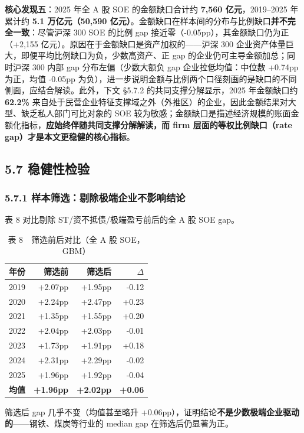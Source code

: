 \documentclass[11pt,a4paper]{ctexart}
\begin{document}
\textbf{核心发现五}：2025 年全 A 股 SOE 的金额缺口合计约 \textbf{7,560 亿元}，2019--2025 年累计约 \textbf{5.1 万亿元（50,590 亿元）}。金额缺口在样本间的分布与比例缺口\textbf{并不完全一致}：尽管沪深 300 SOE 的比例 gap 接近零（-0.05pp），其金额缺口仍为正（+2,155 亿元）。原因在于金额缺口是资产加权的------沪深 300 企业资产体量巨大，即便平均比例缺口为负，少数高资产、正 gap 的企业仍可主导金额加总；同时沪深 300 内部 gap 分布左偏（少数大额负 gap 企业拉低均值：中位数 +0.74pp 为正，均值 -0.05pp 为负），进一步说明金额与比例两个口径刻画的是缺口的不同侧面，应结合解读。此外，下文 \S5.7.2 的共同支撑分解显示，2025 年金额缺口约 \textbf{62.2\%} 来自处于民营企业特征支撑域之外（外推区）的企业，因此金额结果对大型、缺乏私人部门可比对象的 SOE 较为敏感；金额缺口是描述经济规模的账面金额化指标，\textbf{应始终伴随共同支撑分解解读，而 firm 层面的等权比例缺口（rate gap）才是本文更稳健的核心指标}。

\subsection{5.7 稳健性检验}

\subsubsection{5.7.1 样本筛选：剔除极端企业不影响结论}

表 8 对比剔除 ST/资不抵债/极端盈亏前后的全 A 股 SOE gap。

\begin{table}[H]
\centering
\small
\caption{表 8　筛选前后对比（全 A 股 SOE，GBM）}
\begin{tabular}{rrrr}
\toprule
年份 & 筛选前 & 筛选后 & $\Delta$ \\
\midrule
2019 & +2.07pp & +1.95pp & -0.12 \\
2020 & +2.24pp & +2.47pp & +0.23 \\
2021 & +1.35pp & +1.55pp & +0.20 \\
2022 & +2.04pp & +2.03pp & -0.01 \\
2023 & +1.73pp & +1.91pp & +0.18 \\
2024 & +2.31pp & +2.29pp & -0.02 \\
2025 & +1.96pp & +1.92pp & -0.04 \\
\textbf{均值} & \textbf{+1.96pp} & \textbf{+2.02pp} & \textbf{+0.06} \\
\bottomrule
\end{tabular}
\end{table}

筛选后 gap 几乎不变（均值甚至略升 +0.06pp），证明结论\textbf{不是少数极端企业驱动的}------钢铁、煤炭等行业的 median gap 在筛选后仍显著为正。
\end{document}
